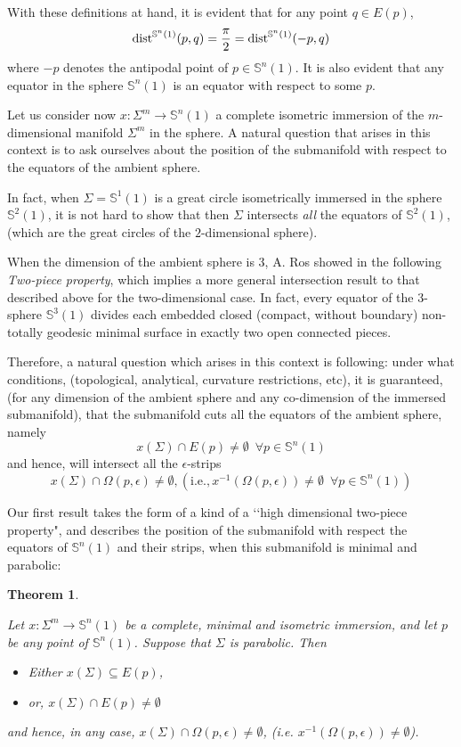 \documentclass{amsart}
\newtheorem{theorem}{Theorem}[section]
\theoremstyle{definition}
\theoremstyle{remark}
\begin{document}
With these definitions at hand, it is evident that for any point $q\in E(p)$, 
        $$
{\rm dist}^{\mathbb{S}^n(1)}(p,q)=\frac{\pi}{2}={\rm dist}^{\mathbb{S}^n(1)}(-p,q)
        $$
where $-p$ denotes the antipodal point of $p \in \mathbb{S}^{n}(1)$. It is also evident  that any equator in the sphere $\mathbb{S}^n(1)$ is an equator with respect to some $p$.

     Let us consider now $x: \Sigma^m \to \mathbb{S}^n(1)$  a complete isometric immersion of the  $m$-dimensional manifold $\Sigma^m$ in the sphere.  A natural question that arises in this context is to ask ourselves about the position of the submanifold with respect to the equators of the ambient sphere. 

     In fact, when $\Sigma=\mathbb{S}^{1}(1)$ is a great circle isometrically immersed in the sphere $\mathbb{S}^{2}(1)$, it is not hard to show that then $\Sigma$ intersects {\em all} the equators of $ \mathbb{S}^{2}(1)$, (which are the great circles of the $2$-dimensional sphere).

     When the dimension of the ambient sphere is $3$, A. Ros showed in \cite{R} the following {\em Two-piece property}, which implies a more general intersection result to that described above for the two-dimensional case. In fact, every equator of the 3-sphere $\mathbb{S}^3(1)$ divides each embedded closed (compact, without boundary) non-totally geodesic minimal surface in exactly two open connected pieces.

    
  Therefore,  a natural question which arises in this context is following: under what conditions, (topological, analytical, curvature restrictions, etc), it is guaranteed, (for any dimension of the ambient sphere and any co-dimension of the immersed submanifold), that the submanifold cuts all the equators of the ambient sphere, namely
        $$x(\Sigma) \cap E(p) \neq \emptyset\,\,\,\forall p \in \mathbb{S}^n(1)$$ and hence, will intersect all the $\epsilon$-strips
        $$x(\Sigma) \cap \Omega(p,\epsilon) \neq \emptyset, (\text{i.e.}, x^{-1}(\Omega(p,\epsilon))\neq \emptyset\,\,\,\forall p \in \mathbb{S}^n(1))$$

    Our first result  takes the form of a kind of a \lq\lq high dimensional two-piece property", and describes the position of the submanifold with respect the equators of $\mathbb{S}^n(1)$ and their strips, when this submanifold is minimal and parabolic:

\begin{theorem}\label{twopiecegeneral}

Let $x:\Sigma^m \to \mathbb{S}^n(1)$ be a complete,  minimal and isometric immersion, and let $p$ be any point of $\mathbb{S}^n(1)$. Suppose that $\Sigma$ is parabolic. Then
    \begin{itemize}
        \item Either $x(\Sigma)\subseteq E(p)$, 
        \item or, $x(\Sigma)\cap E(p)\neq \emptyset$
            \end{itemize}
            and  hence, in any case,  $x(\Sigma) \cap \Omega(p,\epsilon) \neq \emptyset$, (i.e. $x^{-1}(\Omega(p,\epsilon))\neq \emptyset$).
\end{theorem}
\end{document}
